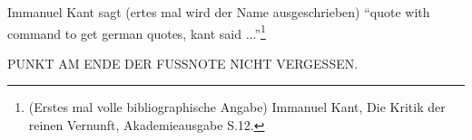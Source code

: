 Immanuel Kant sagt (ertes mal wird der Name ausgeschrieben) \enquote{quote with command to get german quotes, kant said ...}\footnote{ (Erstes mal volle bibliographische Angabe) Immanuel Kant, Die Kritik der reinen Vernunft, Akademieausgabe  S.12.} 

PUNKT AM ENDE DER FUSSNOTE NICHT VERGESSEN.